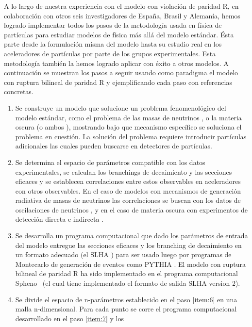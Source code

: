 A lo largo de nuestra experiencia con el modelo con violación de
paridad R, en colaboración con otros seis investigadores de España,
Brasil y Alemanía, hemos logrado implementar todos los pasos de la
metodología usada en física de partículas para estudiar modelos de
física más allá del modelo estándar.  Ésta parte desde la formulación
misma del modelo hasta su estudio real en los aceleradores de
partículas por parte de los grupos experimentales. Esta metodología
también la hemos logrado aplicar con éxito a otros modelos. A
continuación se muestran los pasos a seguir usando como paradigma el
modelo con ruptura bilineal de paridad R y ejemplificando cada paso
con referencias concretas.
\begin{enumerate}
\item Se construye un modelo que solucione un problema fenomenológico
  del modelo estándar, como el problema de las masas de neutrinos
  \cite{Hirsch:2000ef}, o la materia oscura (o ambos
  \cite{Hirsch:2005ag}), mostrando bajo que mecanismo específico se
  soluciona el problema en cuestión. La solución del problema requiere
  introducir partículas adicionales las cuales pueden buscarse en
  detectores de partículas.
  \label{item:5}
\item Se determina el espacio de parámetros compatible con los datos
  experimentales, se calculan los branchings de decaimiento y las
  secciones eficaces y se establecen correlaciones entre estos
  observables en aceleradores con otros observables. En el caso de
  modelos con mecanismos de generación radiativa de masas de neutrinos
  las correlaciones se buscan con los datos de oscilaciones de
  neutrinos \cite{Diaz:2003as}, y en el caso de materia oscura con
  experimentos de detección directa e indirecta \cite{Choi:2010xn}.
  \label{item:6}
\item Se desarrolla un programa computacional que dado los parámetros
  de entrada del modelo entregue las secciones eficaces y los
  branching de decaimiento en un formato adecuado (el SLHA
  \cite{Allanach:2008qq}) para ser usado luego por programas de Montecarlo
  de generación de eventos como PYTHIA \cite{Sjostrand:2006za}. El
  modelo con ruptura bilineal de paridad R ha sido implementado en el
  programa computacional Spheno~\cite{Porod:2003um} (el cual tiene
  implementado el formato de salida SLHA version 2).
  \label{item:7}
\item Se divide el espacio de n-parámetros establecido en el paso
  \ref{item:6} en una malla n-dimensional. Para cada punto se corre el
  programa computacional desarrollado en el paso \ref{item:7} y los

\end{enumerate}
